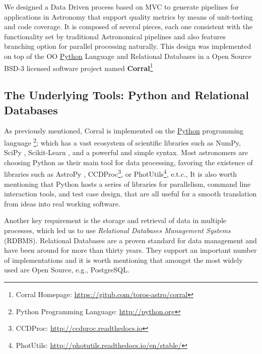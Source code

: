 \documentclass[final,5p,times,twocolumn,authoryear]{elsarticle}
\begin{document}
We designed a Data Driven process based on MVC to generate pipelines for applications in Astronomy that support quality metrics by means of unit-testing and code coverage.
It is composed of several pieces, each one consistent with the functionality
set by traditional Astronomical pipelines and also features
branching option for parallel processing naturally.
%
This design was implemented on
top of the OO \href{http://python.org}{Python} Language and Relational Databases
in a Open Source BSD-3 licensed software project named \textbf{Corral}\footnote{
Corral Homepage: \url{https://gitub.com/toros-astro/corral}}

\subsection{The Underlying Tools: Python and Relational Databases}
%
As previously mentioned, Corral is implemented on the \href{http://python.org}{Python}
programming language \footnote{Python Programming Language: \url{http://python.org}};
which has a vast ecosystem of scientific libraries such as NumPy,
SciPy \cite{van2011numpy}, Scikit-Learn \cite{pedregosa2011scikit}, and a
powerful and simple syntax.
%
Most astronomers are choosing Python as their main tool for data processing, favoring
the existence of libraries such as AstroPy \cite{robitaille2013astropy},
CCDProc\footnote{CCDProc: \url{http://ccdproc.readthedocs.io}}, or
PhotUtils\footnote{PhotUtils: \url{http://photutils.readthedocs.io/en/stable/}}\cite{tollerud2016jwst}, e.t.c.,
%
It is also worth mentioning that Python hosts a series of libraries for parallelism,
command line interaction tools, and test case design, that are all useful for a smooth
translation from ideas into real working software.

Another key requirement is the storage and retrieval of data in multiple processes,
which led us to use
\textit{Relational Databases Management Systems} (RDBMS).
%
Relational Databases are a proven standard for data management and have been around for more than thirty years. They support an important number of implementations and it is worth mentioning that amongst the most widely used are Open Source, e.g., PostgreSQL.
\end{document}
